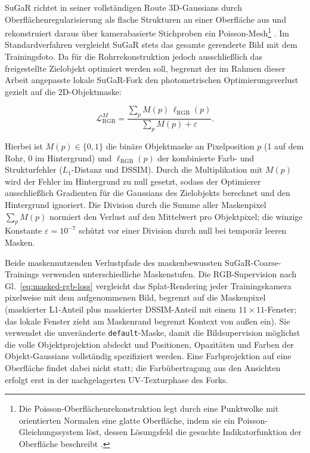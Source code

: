 SuGaR richtet in seiner vollständigen Route 3D-Gaussians durch
Oberflächenregularisierung als flache Strukturen an einer Oberfläche aus und
rekonstruiert daraus über kamerabasierte Stichproben ein
Poisson-Mesh\footnote{Die Poisson-Oberflächenrekonstruktion legt durch eine
Punktwolke mit orientierten Normalen eine glatte Oberfläche, indem sie ein
Poisson-Gleichungssystem löst, dessen Lösungsfeld die gesuchte
Indikatorfunktion der Oberfläche beschreibt \parencite{kazhdan2006poisson}.}
\parencite{guedon2024sugar}. Im Standardverfahren vergleicht SuGaR stets das
gesamte gerenderte Bild mit dem Trainingsfoto. Da für die Rohrrekonstruktion
jedoch ausschließlich das freigestellte Zielobjekt optimiert werden soll,
begrenzt der im Rahmen dieser Arbeit angepasste lokale SuGaR-Fork den
photometrischen Optimierungsverlust gezielt auf die 2D-Objektmaske:

\begin{equation}
	\mathcal{L}_{\mathrm{RGB}}^{M} =
	\frac{\sum_p M(p)\,\ell_{\mathrm{RGB}}(p)}
	{\sum_p M(p) + \varepsilon}.
	\label{eq:masked-rgb-loss}
\end{equation}

Hierbei ist $M(p) \in \{0, 1\}$ die binäre Objektmaske an Pixelposition $p$
(1 auf dem Rohr, 0 im Hintergrund) und $\ell_{\mathrm{RGB}}(p)$ der kombinierte
Farb- und Strukturfehler ($L_1$-Distanz und DSSIM). Durch die Multiplikation
mit $M(p)$ wird der Fehler im Hintergrund zu null gesetzt, sodass der
Optimierer ausschließlich Gradienten für die Gaussians des Zielobjekts
berechnet und den Hintergrund ignoriert. Die Division durch die Summe aller
Maskenpixel $\sum_p M(p)$ normiert den Verlust auf den Mittelwert pro
Objektpixel; die winzige Konstante $\varepsilon = 10^{-7}$ schützt vor einer
Division durch null bei temporär leeren Masken.

Beide maskennutzenden Verlustpfade des maskenbewussten SuGaR-Coarse-Trainings
verwenden unterschiedliche Maskenstufen. Die RGB-Supervision nach
Gl.~\ref{eq:masked-rgb-loss} vergleicht das Splat-Rendering jeder
Trainingskamera pixelweise mit dem aufgenommenen Bild, begrenzt auf die
Maskenpixel (maskierter L1-Anteil plus maskierter DSSIM-Anteil mit einem
$11\times11$-Fenster; das lokale Fenster zieht am Maskenrand begrenzt Kontext
von außen ein). Sie verwendet die unveränderte \texttt{default}-Maske, damit
die Bildsupervision möglichst die volle Objektprojektion abdeckt und
Positionen, Opazitäten und Farben der Objekt-Gaussians vollständig
spezifiziert werden. Eine Farbprojektion auf eine Oberfläche findet dabei
nicht statt; die Farbübertragung aus den Ansichten erfolgt erst in der
nachgelagerten UV-Texturphase des Forks.

